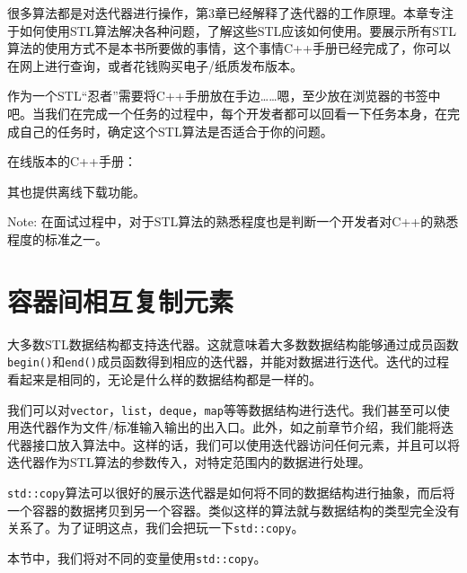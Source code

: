 很多算法都是对迭代器进行操作，第3章已经解释了迭代器的工作原理。本章专注于如何使用STL算法解决各种问题，了解这些STL应该如何使用。要展示所有STL算法的使用方式不是本书所要做的事情，这个事情C++手册已经完成了，你可以在网上进行查询，或者花钱购买电子/纸质发布版本。

作为一个STL“忍者”需要将C++手册放在手边……嗯，至少放在浏览器的书签中吧。当我们在完成一个任务的过程中，每个开发者都可以回看一下任务本身，在完成自己的任务时，确定这个STL算法是否适合于你的问题。

在线版本的C++手册：

其也提供离线下载功能。

\begin{myInfoBox}
Note: 在面试过程中，对于STL算法的熟悉程度也是判断一个开发者对C++的熟悉程度的标准之一。
\end{myInfoBox}


\section{容器间相互复制元素}

大多数STL数据结构都支持迭代器。这就意味着大多数数据结构能够通过成员函数\texttt{begin()}和\texttt{end()}成员函数得到相应的迭代器，并能对数据进行迭代。迭代的过程看起来是相同的，无论是什么样的数据结构都是一样的。

我们可以对\texttt{vector}，\texttt{list}，\texttt{deque}，\texttt{map}等等数据结构进行迭代。我们甚至可以使用迭代器作为文件/标准输入输出的出入口。此外，如之前章节介绍，我们能将迭代器接口放入算法中。这样的话，我们可以使用迭代器访问任何元素，并且可以将迭代器作为STL算法的参数传入，对特定范围内的数据进行处理。

\texttt{std::copy}算法可以很好的展示迭代器是如何将不同的数据结构进行抽象，而后将一个容器的数据拷贝到另一个容器。类似这样的算法就与数据结构的类型完全没有关系了。为了证明这点，我们会把玩一下\texttt{std::copy}。


本节中，我们将对不同的变量使用\texttt{std::copy}。

